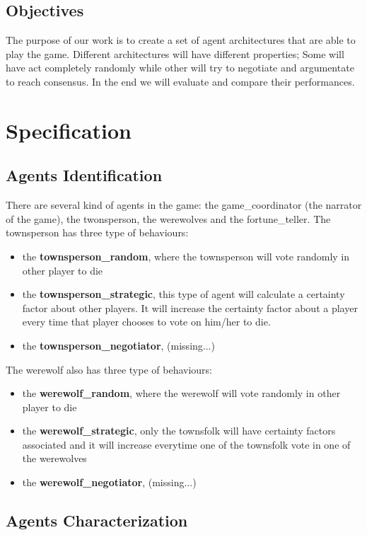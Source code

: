 \documentclass{article}
\begin{document}
\subsection{Objectives}

The purpose of our work is to create a set of agent architectures that are able to play the game. Different architectures will have different properties; Some will have act completely randomly while other will try to negotiate and argumentate to reach consensus. In the end we will evaluate and compare their performances.


\section{Specification}

\subsection{Agents Identification}

There are several kind of agents in the game: the game\_coordinator (the narrator of the game), the twonsperson, the werewolves and the fortune\_teller.
The townsperson has three type of behaviours:
\begin{itemize}
	\item the \textbf{townsperson\_random}, where the townsperson will vote randomly in other player to die
	\item the \textbf{townsperson\_strategic}, this type of agent will calculate a certainty factor about other players. It will increase the certainty factor about a player every time that player chooses to vote on him/her to die. 
	\item the \textbf{townsperson\_negotiator}, (missing...)
\end{itemize}

The werewolf also has three type of behaviours:
\begin{itemize}
	\item the \textbf{werewolf\_random}, where the werewolf will vote randomly in other player to die
	\item the \textbf{werewolf\_strategic}, only the townsfolk will have certainty factors associated and it will increase everytime one of the townsfolk vote in one of the werewolves
	\item the \textbf{werewolf\_negotiator}, (missing...)
\end{itemize}

\subsection{Agents Characterization}
\end{document}
